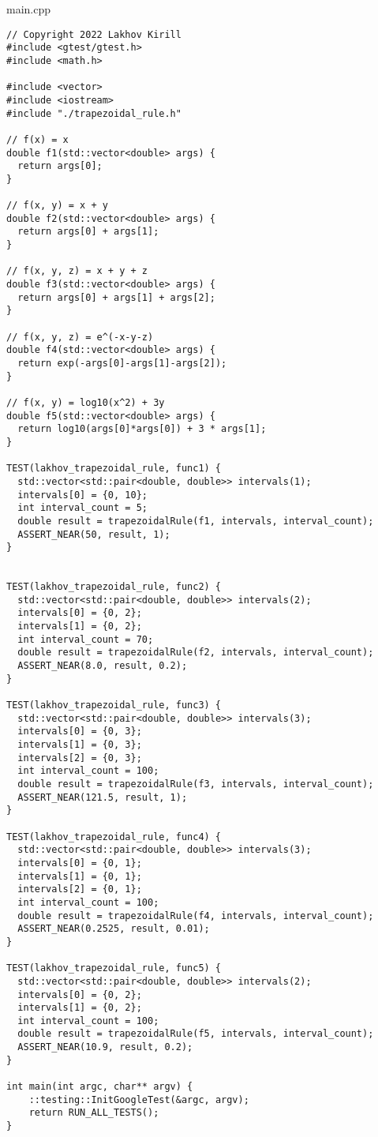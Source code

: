 \documentclass{report}
\begin{document}
main.cpp
\begin{lstlisting}
// Copyright 2022 Lakhov Kirill
#include <gtest/gtest.h>
#include <math.h>

#include <vector>
#include <iostream>
#include "./trapezoidal_rule.h"

// f(x) = x
double f1(std::vector<double> args) {
  return args[0];
}

// f(x, y) = x + y
double f2(std::vector<double> args) {
  return args[0] + args[1];
}

// f(x, y, z) = x + y + z
double f3(std::vector<double> args) {
  return args[0] + args[1] + args[2];
}

// f(x, y, z) = e^(-x-y-z)
double f4(std::vector<double> args) {
  return exp(-args[0]-args[1]-args[2]);
}

// f(x, y) = log10(x^2) + 3y
double f5(std::vector<double> args) {
  return log10(args[0]*args[0]) + 3 * args[1];
}

TEST(lakhov_trapezoidal_rule, func1) {
  std::vector<std::pair<double, double>> intervals(1);
  intervals[0] = {0, 10};
  int interval_count = 5;
  double result = trapezoidalRule(f1, intervals, interval_count);
  ASSERT_NEAR(50, result, 1);
}


TEST(lakhov_trapezoidal_rule, func2) {
  std::vector<std::pair<double, double>> intervals(2);
  intervals[0] = {0, 2};
  intervals[1] = {0, 2};
  int interval_count = 70;
  double result = trapezoidalRule(f2, intervals, interval_count);
  ASSERT_NEAR(8.0, result, 0.2);
}

TEST(lakhov_trapezoidal_rule, func3) {
  std::vector<std::pair<double, double>> intervals(3);
  intervals[0] = {0, 3};
  intervals[1] = {0, 3};
  intervals[2] = {0, 3};
  int interval_count = 100;
  double result = trapezoidalRule(f3, intervals, interval_count);
  ASSERT_NEAR(121.5, result, 1);
}

TEST(lakhov_trapezoidal_rule, func4) {
  std::vector<std::pair<double, double>> intervals(3);
  intervals[0] = {0, 1};
  intervals[1] = {0, 1};
  intervals[2] = {0, 1};
  int interval_count = 100;
  double result = trapezoidalRule(f4, intervals, interval_count);
  ASSERT_NEAR(0.2525, result, 0.01);
}

TEST(lakhov_trapezoidal_rule, func5) {
  std::vector<std::pair<double, double>> intervals(2);
  intervals[0] = {0, 2};
  intervals[1] = {0, 2};
  int interval_count = 100;
  double result = trapezoidalRule(f5, intervals, interval_count);
  ASSERT_NEAR(10.9, result, 0.2);
}

int main(int argc, char** argv) {
    ::testing::InitGoogleTest(&argc, argv);
    return RUN_ALL_TESTS();
}

\end{lstlisting}
\end{document}
